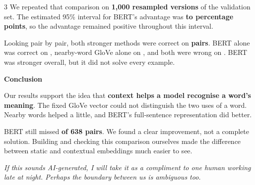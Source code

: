 \documentclass{article}
\newcommand{\smallfont}{\fontsize{22}{26}\selectfont}
\newcommand{\sectiontitle}[1]{%
  \Needspace{4\baselineskip}%
  \par\vspace{5mm}%
  {\fontsize{30}{35}\selectfont\bfseries\textcolor{trierblue}{#1}\par}%
  \vspace{6mm}%
}
\begin{document}
\begin{multicols}{3}
We repeated that comparison on \textbf{1,000 resampled versions} of the validation set. The estimated 95\% interval for BERT's advantage was \textbf{\GainLower{} to \GainUpper{} percentage points}, so the advantage remained positive throughout this interval.

Looking pair by pair, both stronger methods were correct on \textbf{\BothCorrectCount{} pairs}. BERT alone was correct on \textbf{\BertOnlyCount}, nearby-word GloVe alone on \textbf{\StaticOnlyCount}, and both were wrong on \textbf{\BothWrongCount}. BERT was stronger overall, but it did not solve every example.

\sectiontitle{Conclusion}
Our results support the idea that \textbf{context helps a model recognise a word's meaning}. The fixed GloVe vector could not distinguish the two uses of a word. Nearby words helped a little, and BERT's full-sentence representation did better.

BERT still missed \textbf{\BertErrorCount{} of 638 pairs}. We found a clear improvement, not a complete solution. Building and checking this comparison ourselves made the difference between static and contextual embeddings much easier to see.

{\smallfont\textit{If this sounds AI-generated, I will take it as a compliment to one human working late at night. Perhaps the boundary between us is ambiguous too.}\par}
\end{multicols}
\end{document}
